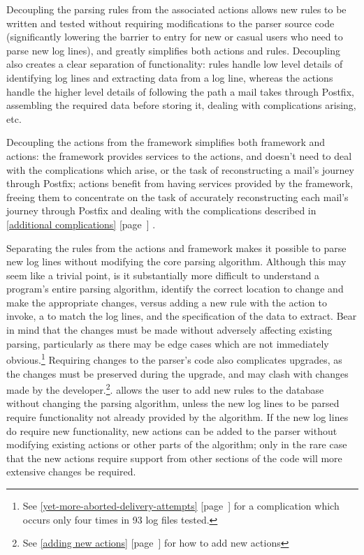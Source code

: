 \documentclass[a4paper,12pt,draft]{article}
\newcommand{\parsername}{\PLP{}}
\newcommand{\refwithpage}[1]{%
    \empty{}\ref{#1} [page~\pageref{#1}]%
}
\newcommand{\sectionref}[1]{%
    \textsection{}\refwithpage{#1}%
}
\newcommand{\numberOFlogFILES}[0]{%
    93%
}
\begin{document}
Decoupling the parsing rules from the associated actions allows new rules
to be written and tested without requiring modifications to the parser
source code (significantly lowering the barrier to entry for new or casual
users who need to parse new log lines), and greatly simplifies both actions
and rules.  Decoupling also creates a clear separation of functionality:
rules handle low level details of identifying log lines and extracting data
from a log line, whereas the actions handle the higher level details of
following the path a mail takes through Postfix, assembling the required
data before storing it, dealing with complications arising, etc.

Decoupling the actions from the framework simplifies both framework and
actions: the framework provides services to the actions, and doesn't need
to deal with the complications which arise, or the task of reconstructing a
mail's journey through Postfix; actions benefit from having services
provided by the framework, freeing them to concentrate on the task of
accurately reconstructing each mail's journey through Postfix and dealing
with the complications described in \sectionref{additional complications}.

Separating the rules from the actions and framework makes it possible to
parse new log lines without modifying the core parsing algorithm.  Although
this may seem like a trivial point, is it substantially more difficult to
understand a program's entire parsing algorithm, identify the correct
location to change and make the appropriate changes, versus adding a new
rule with the action to invoke, a \regex{} to match the log lines, and the
specification of the data to extract.  Bear in mind that the changes must
be made without adversely affecting existing parsing, particularly as there
may be edge cases which are not immediately obvious.\footnote{See
\sectionref{yet-more-aborted-delivery-attempts} for a complication which
occurs only four times in \numberOFlogFILES{} log files tested.}  Requiring
changes to the parser's code also complicates upgrades, as the changes
must be preserved during the upgrade, and may clash with changes made by
the developer.\footnote{See \sectionref{adding new actions} for how to add
new actions}.  \parsername{} allows the user to add new rules to the
database without changing the parsing algorithm, unless the new log lines
to be parsed require functionality not already provided by the algorithm.
If the new log lines do require new functionality, new actions can be added
to the parser without modifying existing actions or other parts of the
algorithm; only in the rare case that the new actions require support from
other sections of the code will more extensive changes be required.
\end{document}
